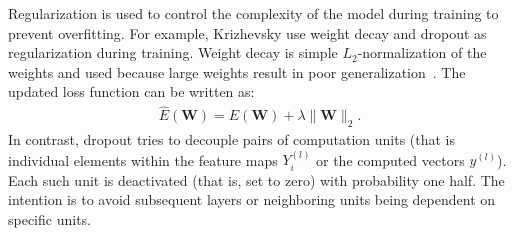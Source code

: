 Regularization is used to control the complexity of the model during training to prevent overfitting. For example, Krizhevsky \etal use weight decay and dropout as regularization during training. Weight decay is simple $L_2$-normalization of the weights and used because large weights result in poor generalization~\cite{Bishop:1995}. The updated loss function can be written as:
\begin{align}
    \hat{E}(\mathbf{W}) = E(\mathbf{W}) + \lambda \|\mathbf{W}\|_2.
\end{align}
In contrast, dropout \cite{KrizhevskySutskeverHinton:2012} tries to decouple pairs of computation units (that is individual elements within the feature maps $Y_i^{(l)}$ or the computed vectors $y^{(l)}$). Each such unit is deactivated (that is, set to zero) with probability one half. The intention is to avoid subsequent layers or neighboring units being dependent on specific units.
